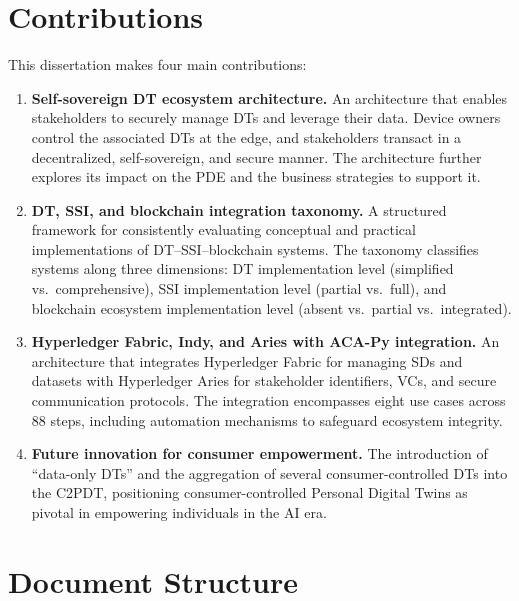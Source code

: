 \section{Contributions}
\label{sec:contributions}

\noindent This dissertation makes four main contributions:

\begin{enumerate}
    \item \textbf{Self-sovereign \ac{DT} ecosystem architecture.} An architecture that enables stakeholders to securely manage \acp{DT} and leverage their data. Device owners control the associated \acp{DT} at the edge, and stakeholders transact in a decentralized, self-sovereign, and secure manner. The architecture further explores its impact on the \ac{PDE} and the business strategies to support it.

    \item \textbf{\ac{DT}, \ac{SSI}, and blockchain integration taxonomy.} A structured framework for consistently evaluating conceptual and practical implementations of \ac{DT}--\ac{SSI}--blockchain systems. The taxonomy classifies systems along three dimensions: \ac{DT} implementation level (simplified vs.\ comprehensive), \ac{SSI} implementation level (partial vs.\ full), and blockchain ecosystem implementation level (absent vs.\ partial vs.\ integrated).

    \item \textbf{Hyperledger Fabric, Indy, and Aries with ACA-Py integration.} An architecture that integrates Hyperledger Fabric for managing \acp{SD} and datasets with Hyperledger Aries for stakeholder identifiers, \acp{VC}, and secure communication protocols. The integration encompasses eight use cases across 88 steps, including automation mechanisms to safeguard ecosystem integrity.

    \item \textbf{Future innovation for consumer empowerment.} The introduction of ``data-only \acp{DT}'' and the aggregation of several consumer-controlled \acp{DT} into the \ac{C2PDT}, positioning consumer-controlled Personal Digital Twins as pivotal in empowering individuals in the \ac{AI} era.
\end{enumerate}

\section{Document Structure}
\label{sec:structure}

